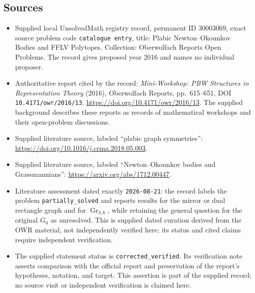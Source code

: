 \documentclass[11pt]{article}
\begin{document}
\subsection{Sources}
\begin{itemize}
\item Supplied local UnsolvedMath registry record, permanent ID \(30003069\), exact source problem code \texttt{catalogue entry}, title: Plabic Newton--Okounkov Bodies and FFLV Polytopes. Collection: Oberwolfach Reports Open Problems. The record gives proposed year 2016 and names no individual proposer.
\item Authoritative report cited by the record: \emph{Mini-Workshop: PBW Structures in Representation Theory} (2016), Oberwolfach Reports, pp.~615--651, DOI \texttt{10.4171/owr/2016/13}. \url{https://doi.org/10.4171/owr/2016/13}. The supplied background describes these reports as records of mathematical workshops and their open-problem discussions.
\item Supplied literature source, labeled ``plabic graph symmetries'': \url{https://doi.org/10.1016/j.crma.2018.05.003}.
\item Supplied literature source, labeled ``Newton--Okounkov bodies and Grassmannians'': \url{https://arxiv.org/abs/1712.00447}.
\item Literature assessment dated exactly \texttt{2026-08-21}: the record labels the problem \texttt{partially\_solved} and reports results for the mirror or dual rectangle graph and for \(\operatorname{Gr}_{3,6}\), while retaining the general question for the original \(G_0\) as unresolved. This is supplied dated curation derived from the OWR material, not independently verified here; its status and cited claims require independent verification.
\item The supplied statement status is \texttt{corrected\_verified}. Its verification note asserts comparison with the official report and preservation of the report's hypotheses, notation, and target. This assertion is part of the supplied record; no source visit or independent verification is claimed here.
\end{itemize}
\end{document}
